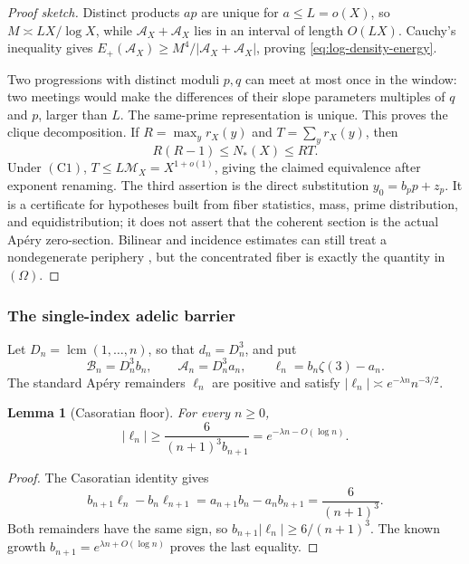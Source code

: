 \documentclass[11pt]{amsart}
\DeclareMathOperator{\lcm}{lcm}
\theoremstyle{plain}
\newtheorem{lemma}{Lemma}
\theoremstyle{remark}
\begin{document}
\begin{proof}[Proof sketch]
Distinct products $ap$ are unique for $a\leq L=o(X)$, so
$M\asymp LX/\log X$, while $\mathcal A_X+\mathcal A_X$ lies in an
interval of length $O(LX)$.  Cauchy's inequality gives
$E_+(\mathcal A_X)\geq M^4/|\mathcal A_X+\mathcal A_X|$, proving
\eqref{eq:log-density-energy}.

Two progressions with distinct moduli $p,q$ can meet at most once in
the window: two meetings would make the differences of their slope
parameters multiples of $q$ and $p$, larger than $L$.  The same-prime
representation is unique.  This proves the clique decomposition.  If
$R=\max_y r_X(y)$ and $T=\sum_y r_X(y)$, then
\[
 R(R-1)\leq N_*(X)\leq RT.
\]
Under $(\mathrm C1)$, $T\leq L\mathcal M_X=X^{1+o(1)}$, giving the
claimed equivalence after exponent renaming.  The third assertion is
the direct substitution $y_0=b_pp+z_p$.  It is a certificate for
hypotheses built from fiber statistics, mass, prime distribution, and
equidistribution; it does not assert that the coherent section is the
actual Ap\'ery zero-section.  Bilinear and incidence estimates can
still treat a nondegenerate periphery
\cite{FouvryIwaniec1983,BombieriFriedlanderIwaniec1986,
DFI1997,BettinChandee2018}, but the concentrated fiber is exactly the
quantity in $(\Omega)$.
\end{proof}

\subsubsection{The single-index adelic barrier}

Let $D_n=\lcm(1,\ldots,n)$, so that $d_n=D_n^3$, and put
\[
 \mathcal B_n=D_n^3b_n,\qquad
 \mathcal A_n=D_n^3a_n,\qquad
 \ell_n=b_n\zeta(3)-a_n.
 \tag{8.14}\label{eq:adelic-data}
\]
The standard Ap\'ery remainders $\ell_n$ are positive and satisfy
$|\ell_n|\asymp e^{-\lambda n}n^{-3/2}$.

\begin{lemma}[Casoratian floor]
\label{lem:casoratian-floor}
For every $n\geq0$,
\[
 |\ell_n|\geq\frac{6}{(n+1)^3b_{n+1}}
 =e^{-\lambda n-O(\log n)}.
 \tag{8.15}\label{eq:casoratian-floor}
\]
\end{lemma}

\begin{proof}
The Casoratian identity gives
\[
 b_{n+1}\ell_n-b_n\ell_{n+1}
 =a_{n+1}b_n-a_nb_{n+1}=\frac6{(n+1)^3}.
\]
Both remainders have the same sign, so
$b_{n+1}|\ell_n|\geq6/(n+1)^3$.  The known growth
$b_{n+1}=e^{\lambda n+O(\log n)}$ proves the last equality.
\end{proof}
\end{document}
